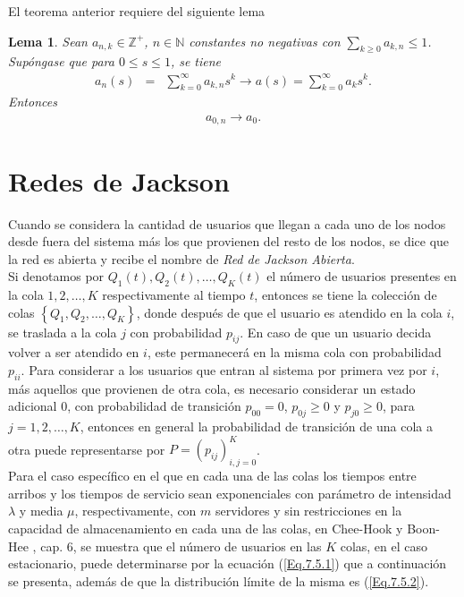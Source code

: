 \documentclass{article}
\newtheorem{Lemma}{Lema}
\newcommand{\nat}{\mathbb{N}}
\newcommand{\ent}{\mathbb{Z}}
\begin{document}
El teorema anterior requiere del siguiente lema

\begin{Lemma}
Sean $a_{n,k}\in\ent^{+}$, $n\in\nat$ constantes no negativas con $\sum_{k\geq0}a_{k,n}\leq1$. Sup\'ongase que para $0\leq s\leq1$,
se tiene
\begin{eqnarray*}
a_{n}\left(s\right)&=&\sum_{k=0}^{\infty}a_{k,n}s^{k}\rightarrow
a\left(s\right)=\sum_{k=0}^{\infty}a_{k}s^{k}.
\end{eqnarray*}
Entonces
\begin{eqnarray*}
a_{0,n}\rightarrow a_{0}.
\end{eqnarray*}
\end{Lemma}


\section{Redes de Jackson}
Cuando se considera la cantidad de
usuarios que llegan a cada uno de los nodos desde fuera del
sistema m\'as los que provienen del resto de los nodos, se dice
que la red es abierta y recibe el nombre de {\em Red de Jackson Abierta}.\\

Si denotamos por $Q_{1}\left(t\right),Q_{2}\left(t\right),\ldots,Q_{K}\left(t\right)$ el n\'umero de usuarios presentes en la cola $1,2,\ldots,K$ respectivamente al tiempo $t$, entonces se tiene la colecci\'on de colas $\left\{Q_{1},Q_{2},\ldots,Q_{K}\right\}$, donde despu\'es de que el usuario es atendido en la cola $i$, se traslada a la cola $j$ con probabilidad $p_{ij}$. En caso de que un usuario decida volver a ser atendido en $i$, este permanecer\'a en la misma cola con probabilidad $p_{ii}$. Para considerar a los usuarios que entran al sistema por primera vez por $i$, m\'as aquellos que provienen de otra cola, es necesario considerar un estado adicional $0$, con probabilidad de transici\'on $p_{00}=0$, $p_{0j}\geq0$ y $p_{j0}\geq0$, para $j=1,2,\ldots,K$, entonces en general la probabilidad de transici\'on de una cola a otra puede representarse por $P=\left(p_{ij}\right)_{i,j=0}^{K}$.\\

Para el caso espec\'ifico en el que en cada una de las colas los tiempos entre arribos y los tiempos de servicio sean exponenciales con par\'ametro de intensidad $\lambda$ y media $\mu$, respectivamente, con $m$ servidores y sin restricciones en la capacidad de almacenamiento en cada una de las colas, en Chee-Hook y Boon-Hee \cite{HookHee}, cap. 6, se muestra que el n\'umero de
usuarios en las $K$ colas, en el caso estacionario, puede determinarse por la ecuaci\'on (\ref{Eq.7.5.1})  que a
continuaci\'on se presenta, adem\'as de que la distribuci\'on l\'imite de la misma es (\ref{Eq.7.5.2}).\\
\end{document}
